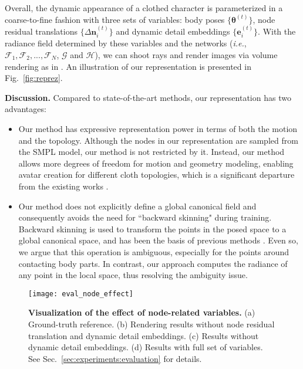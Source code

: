 Overall, the dynamic appearance of a clothed character is parameterized in a coarse-to-fine fashion with three sets of variables: body poses $\{\bm{\theta}^{(t)}\}$, node residual translations $\{\Delta\bm{n}_i^{(t)}\}$ and dynamic detail embeddings $\{\bm{e}_i^{(t)}\}$. With the radiance field determined by these variables and the networks (\textit{i.e.}, $\mathcal{F}_1, \mathcal{F}_2, ..., \mathcal{F}_N$, $\mathcal{G}$ and $\mathcal{H}$), we can shoot rays and render images via volume rendering as in \cite{mildenhall2020nerf}. An illustration of our representation is presented in Fig.~\ref{fig:reprez}. 


\textbf{Discussion. }
Compared to state-of-the-art methods, our representation has two advantages:
\begin{itemize}[leftmargin=*]
\setlength{\itemsep}{0pt}
\setlength{\parsep}{0pt}
\setlength{\parskip}{0pt}
\vspace{-0.2cm}
    \item Our method has expressive representation power in terms of both the motion and the topology. Although the nodes in our representation are sampled from the SMPL model, our method is not restricted by it. Instead, our method allows more degrees of freedom for motion and geometry modeling, enabling avatar creation for different cloth topologies, which is a significant departure from the existing works \cite{peng2021animatable_nerf,neural_actors,Shysheya2019TNR,raj2020anr}. 
    \item Our method does not explicitly define a global canonical field and consequently avoids the need for ``backward skinning" during training. Backward skinning is used to transform the points in the posed space to a global canonical space, and has been the basis of previous methods  \cite{peng2021animatable_nerf,neural_actors,Saito:SCANimate:2021}. Even so, we argue that this operation is ambiguous, especially for the points around contacting body parts. In contrast, our approach computes the radiance of any point in the local space, thus resolving the ambiguity issue. 
\vspace{-0.2cm}
\end{itemize}




\begin{figure}
    \centering
    \texttt{[image: eval\_node\_effect]}
    \caption{\textbf{Visualization of the effect of node-related variables.} (a) Ground-truth reference. (b) Rendering results without node residual translation and dynamic detail embeddings. (c) Results without dynamic detail embeddings. (d) Results with full set of variables. See Sec.~\ref{sec:experiments:evaluation} for details.}
    \label{fig:eval_node_effect}
\end{figure}




